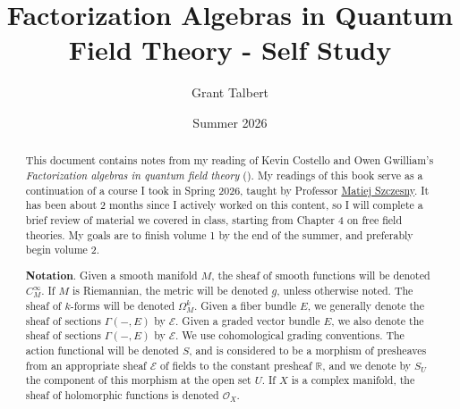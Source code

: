 \documentclass[A4, 11pt]{report}
\title{Factorization Algebras in Quantum Field Theory - Self Study}
\date{Summer 2026}
\author{Grant Talbert}
\begin{document}
	\maketitle

	\begin{abstract}
		This document contains notes from my reading of Kevin Costello and Owen Gwilliam's \emph{Factorization algebras in quantum field theory} (\cite{cg1,cg2}). My readings of this book serve as a continuation of a course I took in Spring 2026, taught by Professor \href{https://math.bu.edu/people/szczesny/}{Matiej Szczesny}. It has been about 2 months since I actively worked on this content, so I will complete a brief review of material we covered in class, starting from Chapter 4 on free field theories. My goals are to finish volume 1 by the end of the summer, and preferably begin volume 2.

		\textbf{Notation}. Given a smooth manifold $M$, the sheaf of smooth functions will be denoted $C^\infty _M$. If $M$ is Riemannian, the metric will be denoted $g$, unless otherwise noted. The sheaf of $k$-forms will be denoted $\Omega ^k_M$. Given a fiber bundle $E$, we generally denote the sheaf of sections $\Gamma (-,E)$ by $\mathcal{E} $. Given a graded vector bundle $E$, we also denote the sheaf of sections $\Gamma (-,E)$ by $\mathcal{E} $. We use cohomological grading conventions. The action functional will be denoted $S$, and is considered to be a morphism of presheaves from an appropriate sheaf $\mathcal{E} $ of fields to the constant presheaf $\mathbb{R} $, and we denote by $S_U$ the component of this morphism at the open set $U$. If $X$ is a complex manifold, the sheaf of holomorphic functions is denoted $\mathcal{O} _X$.
	\end{abstract}
	
	
	\tableofcontents


	\setcounter{chapter}{2}

	
	
	
	


	
	
\end{document}
